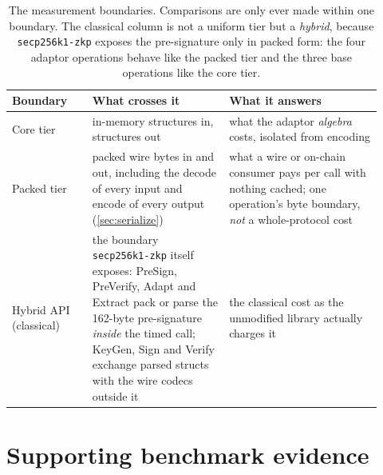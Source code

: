 \begin{table}[H]
  \centering
  \caption[The three measurement boundaries]{The measurement boundaries. Comparisons
  are only ever made within one boundary. The classical column is not a uniform tier
  but a \emph{hybrid}, because \texttt{secp256k1-zkp} exposes the pre-signature only in
  packed form: the four adaptor operations behave like the packed tier and the three
  base operations like the core tier.}
  \label{tab:tiers}
  \small
  \begin{tabular}{@{}L{0.20\linewidth}L{0.34\linewidth}L{0.38\linewidth}@{}}
    \toprule
    Boundary & What crosses it & What it answers \\
    \midrule
    Core tier
      & in-memory structures in, structures out
      & what the adaptor \emph{algebra} costs, isolated from encoding \\[3pt]
    Packed tier
      & packed wire bytes in and out, including the decode of every input
        and encode of every output (\cref{sec:serialize})
      & what a wire or on-chain consumer pays per call with nothing cached; one
        operation's byte boundary, \emph{not} a whole-protocol cost \\[3pt]
    Hybrid API (classical)
      & the boundary \texttt{secp256k1-zkp} itself exposes: PreSign, PreVerify, Adapt
        and Extract pack or parse the 162-byte pre-signature \emph{inside} the timed
        call; KeyGen, Sign and Verify exchange parsed structs with the wire codecs
        outside it
      & the classical cost as the unmodified library actually charges it \\
    \bottomrule
  \end{tabular}
\end{table}

\FloatBarrier

\section{Supporting benchmark evidence}
\label{app:tables}

\begingroup
\setlength{\floatsep}{7pt plus 1pt minus 2pt}
\setlength{\textfloatsep}{7pt plus 1pt minus 2pt}
\setlength{\intextsep}{5pt plus 1pt minus 1pt}
\setlength{\abovecaptionskip}{3pt}
\setlength{\belowcaptionskip}{0pt}

